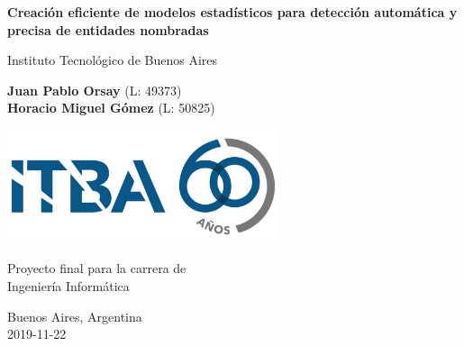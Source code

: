 \begin{titlepage}
    \begin{center}
        \vspace*{1cm}

        \Huge
        \textbf{Creación eficiente de modelos estadísticos para detección automática y precisa de entidades nombradas}

        \vspace{0.5cm}
        \LARGE
        Instituto Tecnológico de Buenos Aires

        \vspace{1.5cm}

        \textbf{Juan Pablo Orsay} (L: 49373)\\
        \textbf{Horacio Miguel Gómez} (L: 50825)

        \vfill

        \includegraphics[width=0.6\textwidth]{assets/logoItba}

        \vspace{0.8cm}

        Proyecto final para la carrera de\\
        Ingeniería Informática

        \vspace{0.8cm}

        \Large
        Buenos Aires, Argentina\\
        2019-11-22

    \end{center}
\end{titlepage}

\let\maketitle\oldmaketitle
